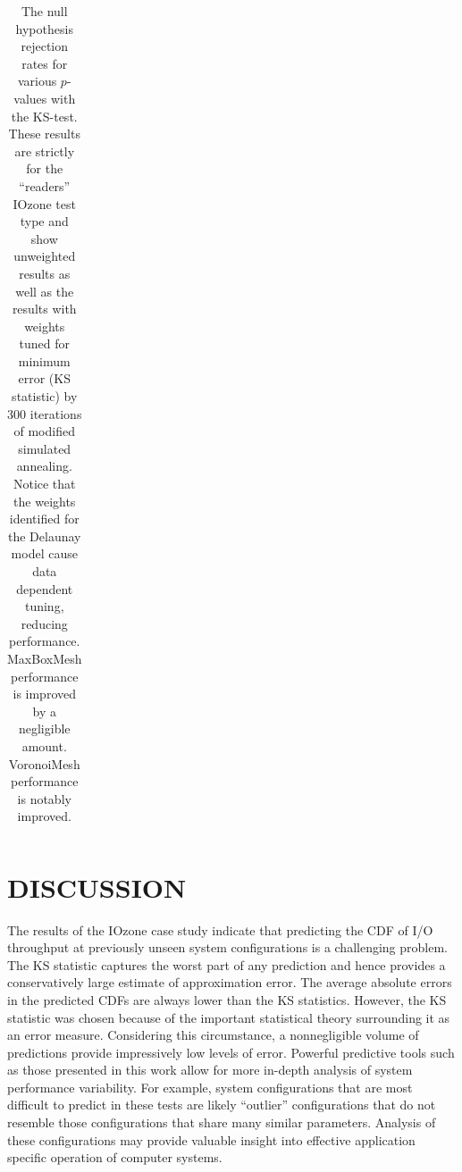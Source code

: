 \documentclass[letterpaper, 10 pt, conference]{ieeeconf}  %
\begin{document}
\begin{table}
\begin{tabular}{c|c|c|c}
    \hline
  \end{tabular}
  \caption{The null hypothesis rejection rates for various $p$-values with the KS-test. These results are strictly for the ``readers'' IOzone test type and show unweighted results as well as the results with weights tuned for minimum error (KS statistic) by 300 iterations of modified simulated annealing. Notice that the weights identified for the Delaunay model cause data dependent tuning, reducing performance. MaxBoxMesh performance is improved by a negligible amount. VoronoiMesh performance is notably improved.
    \vspace{-.5cm}}
  \label{tab:optimized_p_value_failure_rate}
\end{table}


\section{DISCUSSION}
\label{sec:discussion}

The results of the IOzone case study indicate that predicting the CDF of I/O throughput at previously unseen system configurations is a challenging problem. The KS statistic captures the worst part of any prediction and hence provides a conservatively large estimate of approximation error. The average absolute errors in the predicted CDFs are always lower than the KS statistics. However, the KS statistic was chosen because of the important statistical theory surrounding it as an error measure. Considering this circumstance, a nonnegligible volume of predictions provide impressively low levels of error. Powerful predictive tools such as those presented in this work allow for more in-depth analysis of system performance variability. For example, system configurations that are most difficult to predict in these tests are likely ``outlier'' configurations that do not resemble those configurations that share many similar parameters. Analysis of these configurations may provide valuable insight into effective application specific operation of computer systems.
\end{document}
